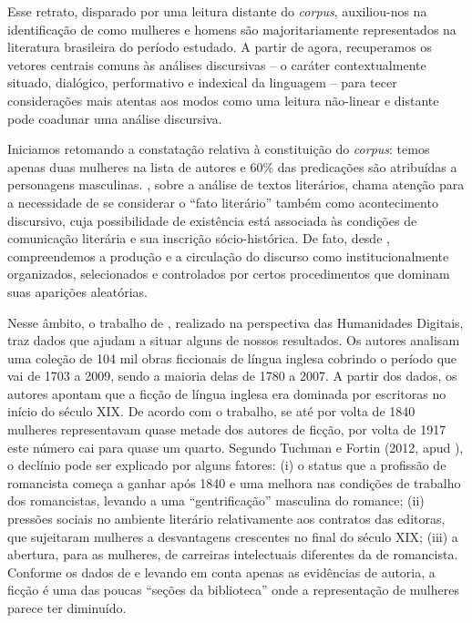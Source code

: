 \documentclass[portuguese]{textolivre}
\begin{document}
Esse retrato, disparado por uma leitura distante do \textit{corpus}, auxiliou-nos na identificação de como mulheres e homens são majoritariamente representados na literatura brasileira do período estudado. A partir de agora, recuperamos os vetores centrais comuns às análises discursivas – o caráter contextualmente situado, dialógico, performativo e indexical da linguagem – para tecer considerações mais atentas aos modos como uma leitura não-linear e distante pode coadunar uma análise discursiva.

Iniciamos retomando a constatação relativa à constituição do \textit{corpus}: temos apenas duas mulheres na lista de autores e 60\% das predicações são atribuídas a personagens masculinas. \textcite{maingueneau2006}, sobre a análise de textos literários, chama atenção para a necessidade de se considerar o “fato literário” também como acontecimento discursivo, cuja possibilidade de existência está associada às condições de comunicação literária e sua inscrição sócio-histórica. De fato, desde \textcite{foucault_ordem_2012}, compreendemos a produção e a circulação do discurso como institucionalmente organizados, selecionados e controlados por certos procedimentos que dominam suas aparições aleatórias.

Nesse âmbito, o trabalho de \textcite{underwood2018}, realizado na perspectiva das Humanidades Digitais, traz dados que ajudam a situar alguns de nossos resultados. Os autores analisam uma coleção de 104 mil obras ficcionais de língua inglesa cobrindo o período que vai de 1703 a 2009, sendo a maioria delas de 1780 a 2007. A partir dos dados, os autores apontam que a ficção de língua inglesa era dominada por escritoras no início do século XIX. De acordo com o trabalho, se até por volta de 1840 mulheres representavam quase metade dos autores de ficção, por volta de 1917 este número cai para quase um quarto. Segundo Tuchman e Fortin (2012, apud \cite{underwood2018}), o declínio pode ser explicado por alguns fatores: (i) o status que a profissão de romancista começa a ganhar após 1840 e uma melhora nas condições de trabalho dos romancistas, levando a uma “gentrificação” masculina do romance; (ii) pressões sociais no ambiente literário relativamente aos contratos das editoras, que sujeitaram mulheres a desvantagens crescentes no final do século XIX; (iii) a abertura, para as mulheres, de carreiras intelectuais diferentes da de romancista. Conforme os dados de \textcite{underwood2018} e levando em conta apenas as evidências de autoria, a ficção é uma das poucas “seções da biblioteca” onde a representação de mulheres parece ter diminuído.
\end{document}
